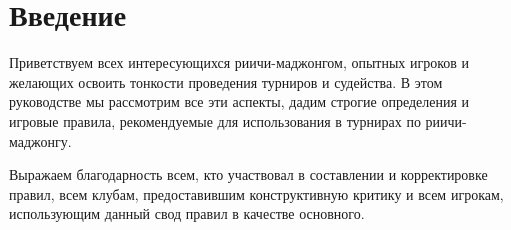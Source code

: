 \section{Введение}

Приветствуем всех интересующихся риичи-маджонгом, опытных игроков и желающих освоить тонкости проведения турниров и судейства. В этом руководстве мы рассмотрим все эти аспекты, дадим строгие определения и игровые правила, рекомендуемые для использования в турнирах по риичи-маджонгу.

Выражаем благодарность всем, кто участвовал в составлении и корректировке правил, всем клубам, предоставившим конструктивную критику и всем игрокам, использующим данный свод правил в качестве основного.
